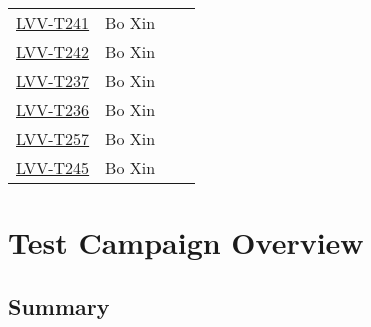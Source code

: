 \documentclass[SE,lsstdraft,STR,toc]{lsstdoc}
\begin{document}
\begin{longtable}{p{3cm}p{3cm}p{3cm}p{6cm}}
\begin{minipage}[]{6cm}
\smallskip
{\small  }
\medskip
\end{minipage}
\\ \hline
\href{https://jira.lsstcorp.org/secure/Tests.jspa#/testCase/LVV-T241}{LVV-T241}
& {\small Bo Xin } & {\small  } &
\begin{minipage}[]{6cm}
\smallskip
{\small  }
\medskip
\end{minipage}
\\ \hline
\href{https://jira.lsstcorp.org/secure/Tests.jspa#/testCase/LVV-T242}{LVV-T242}
& {\small Bo Xin } & {\small  } &
\begin{minipage}[]{6cm}
\smallskip
{\small  }
\medskip
\end{minipage}
\\ \hline
\href{https://jira.lsstcorp.org/secure/Tests.jspa#/testCase/LVV-T237}{LVV-T237}
& {\small Bo Xin } & {\small  } &
\begin{minipage}[]{6cm}
\smallskip
{\small  }
\medskip
\end{minipage}
\\ \hline
\href{https://jira.lsstcorp.org/secure/Tests.jspa#/testCase/LVV-T236}{LVV-T236}
& {\small Bo Xin } & {\small  } &
\begin{minipage}[]{6cm}
\smallskip
{\small  }
\medskip
\end{minipage}
\\ \hline
\href{https://jira.lsstcorp.org/secure/Tests.jspa#/testCase/LVV-T257}{LVV-T257}
& {\small Bo Xin } & {\small  } &
\begin{minipage}[]{6cm}
\smallskip
{\small  }
\medskip
\end{minipage}
\\ \hline
\href{https://jira.lsstcorp.org/secure/Tests.jspa#/testCase/LVV-T245}{LVV-T245}
& {\small Bo Xin } & {\small  } &
\begin{minipage}[]{6cm}
\smallskip
{\small  }
\medskip
\end{minipage}
\\ \hline
\end{longtable}

\newpage

\section{Test Campaign Overview}
\label{sect:overview}

\subsection{Summary}
\label{sect:summarytable}
\end{document}

